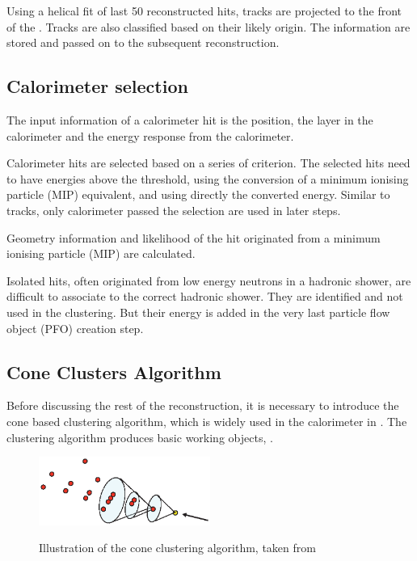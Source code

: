 Using a helical fit of last 50 reconstructed hits, tracks are projected to the front of the \ECAL. Tracks are also classified based on their likely origin. The information are stored and passed on to the subsequent reconstruction.

\subsection{Calorimeter selection}

The input information of a calorimeter hit is the position, the layer in the calorimeter and the energy response from the calorimeter. 

Calorimeter hits are selected based on a series of criterion. The selected hits need to have energies above the threshold, using the conversion of a minimum ionising particle (MIP) equivalent, and using directly the converted energy. Similar to tracks, only calorimeter passed the selection are used in later steps. 

Geometry information and likelihood of the hit originated from a minimum ionising particle (MIP) are calculated. 

Isolated hits, often originated from low energy neutrons in a hadronic shower, are difficult to associate to the correct hadronic shower. They are identified and not used in the clustering. But their energy is added in the very last particle flow object (PFO) creation step.

\subsection{Cone Clusters Algorithm}
\label{sec:pandoraConeCluster}
Before discussing the rest of the \pandora reconstruction, it is necessary to introduce the cone based clustering algorithm, which is widely used in the calorimeter in \pandora. The clustering algorithm produces basic working objects, \clusters. 


\begin{figure}[tbph]
\centering
{\includegraphics[width=0.5\textwidth]{pandora/coneClustering}}%

\caption{Illustration of the cone clustering algorithm, taken from \cite{Marshall:pandoraLC}}
\label{fig:pandoraConeClustering}
\end{figure}

